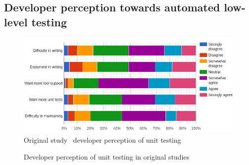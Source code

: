 \subsection{Developer perception towards automated low-level testing}
    \begin{figure}[ht]
      \begin{center}
        \includegraphics[width=14.7cm]{images/perception-org.png}
        \caption{Original study~\cite{daka2014survey} developer perception of unit testing}
        \label{fig:TDD}
      \end{center}
    \end{figure}

    \begin{figure}[ht]%
        \centering
        \qquad
        \caption{Developer perception of unit testing in original studies}%
        \label{fig:example}%
    \end{figure}

